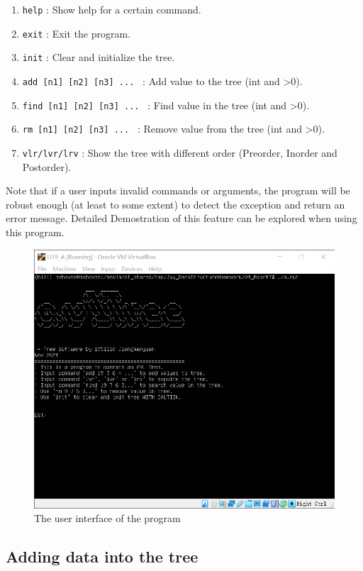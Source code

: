 \documentclass[cn,black,12pt,normal]{elegantnote}
\begin{document}
\begin{enumerate}
    \item \lstinline{help} : Show help for a certain command.
    \item \lstinline{exit} : Exit the program.
    \item \lstinline{init} : Clear and initialize the tree.
    \item \lstinline{add [n1] [n2] [n3] ... } : Add value to the tree (int and >0).
    \item \lstinline{find [n1] [n2] [n3] ... } : Find value in the tree (int and >0).
    \item \lstinline{rm [n1] [n2] [n3] ... } : Remove value from the tree (int and >0).
    \item \lstinline{vlr/lvr/lrv} : Show the tree with different order (Preorder, Inorder and Postorder).
\end{enumerate}
Note that if a user inputs invalid commands or arguments, the program will be robust enough (at least to some extent) to detect the exception and return an error message. Detailed Demostration of this feature can be explored when using this program.

\begin{figure}[H]
    \centering
    \includegraphics[width=0.7\linewidth]{image/avl_01.jpg}
    \caption{The user interface of the program}
\end{figure}



\subsection{Adding data into the tree}
\end{document}
